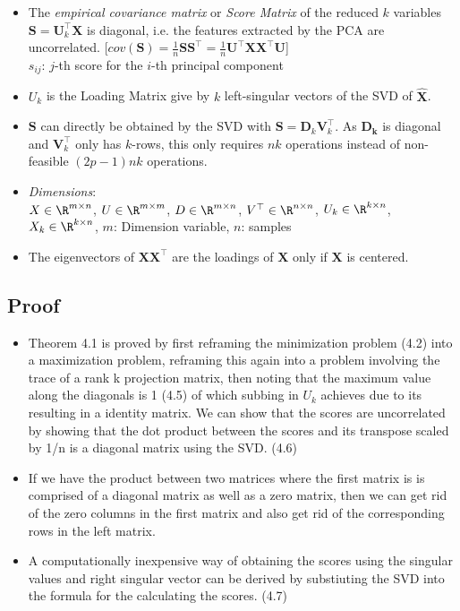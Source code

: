 \documentclass[english]{latex4ei/latex4ei_sheet}
\begin{document}
\begin{sectionbox}
\begin{itemize}
\item The \emph{empirical covariance matrix} or \emph{Score Matrix} of the reduced $k$ variables $\mathbf{S}=\mathbf{U}_k^{\top}\mathbf{X}$ is diagonal, i.e. the features extracted by the PCA are uncorrelated.        [$cov(\mathbf{S})=\frac{1}{n}\mathbf{S}\mathbf{S}^{\top}=\frac{1}{n}\mathbf{U}^{\top}\mathbf{X}\mathbf{X}^{\top}\mathbf{U}$]\\
$s_{ij}$: $j$-th score for the $i$-th principal component
\item $U_k$ is the Loading Matrix give by $k$ left-singular vectors of the SVD of $\mathbf{\hat{X}}$.
\item $\mathbf{S}$ can directly be obtained by the SVD with $\mathbf{S}=\mathbf{D}_k\mathbf{V}_k^{\top}$. As $\mathbf{D_k}$ is diagonal and $\mathbf{V}_k^{\top}$ only has $k$-rows, this only requires $nk$ operations instead of non-feasible $(2p-1)nk$ operations.
\item \emph{Dimensions}:\\ $X\in\R^{m\times n}$, $U\in\R^{m\times m}$, $D\in\R^{m\times n}$, $V^{\top}\in\R^{n\times n}$, $U_k\in\R^{k\times n}$, $X_k\in\R^{k\times n}$, $m$: Dimension variable, $n$: samples
\item The eigenvectors of $\mathbf{X}\mathbf{X}^{\top}$ are the loadings of $\mathbf{X}$ only if $\mathbf{X}$ is centered.
\end{itemize}

\subsection{Proof}
\begin{itemize}
\item Theorem 4.1 is proved by first reframing the minimization problem (4.2) into a maximization problem, reframing this again into a problem involving the trace of a rank k projection matrix, then noting that the maximum value along the diagonals is 1 (4.5) of which subbing in $U_k$ achieves due to its resulting in a identity matrix.
We can show that the scores are uncorrelated by showing that the dot product between the scores and its transpose scaled by 1/n is a diagonal matrix using the SVD. (4.6)
\item If we have the product between two matrices where the first matrix is is comprised of a diagonal matrix as well as a zero matrix, then we can get rid of the zero columns in the first matrix and also get rid of the corresponding rows in the left matrix.
\item A computationally inexpensive way of obtaining the scores using the singular values and right singular vector can be derived by substiuting the SVD into the formula for the calculating the scores. (4.7)
\end{itemize}


\end{sectionbox}
\end{document}
